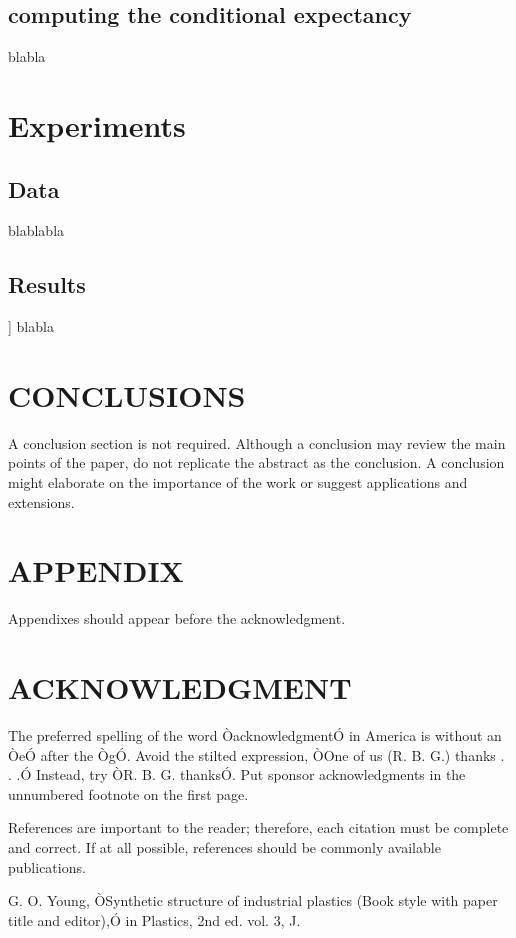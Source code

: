 \documentclass[letterpaper, 10 pt, conference]{IEEEtran}
\begin{document}
	\subsection{computing the conditional expectancy}
	blabla
	
	\section{Experiments}
	
	\subsection{Data}
	
	blablabla
	
	\subsection{Results}]
	blabla
	\section{CONCLUSIONS}
	
	A conclusion section is not required. Although a conclusion may review the main points of the paper, do not replicate the abstract as the conclusion. A conclusion might elaborate on the importance of the work or suggest applications and extensions. 
	
	\addtolength{\textheight}{-12cm}  
	
	
	\section*{APPENDIX}
	
	Appendixes should appear before the acknowledgment.
	
	\section*{ACKNOWLEDGMENT}
	
	The preferred spelling of the word ÒacknowledgmentÓ in America is without an ÒeÓ after the ÒgÓ. Avoid the stilted expression, ÒOne of us (R. B. G.) thanks . . .Ó  Instead, try ÒR. B. G. thanksÓ. Put sponsor acknowledgments in the unnumbered footnote on the first page.
	
	
	
	References are important to the reader; therefore, each citation must be complete and correct. If at all possible, references should be commonly available publications.
	
	
	
	\begin{thebibliography}{99}
		
		 G. O. Young, ÒSynthetic structure of industrial plastics (Book style with paper title and editor),Ó 	in Plastics, 2nd ed. vol. 3, J.
		
	\end{thebibliography}
	
	
	
	
\end{document}

